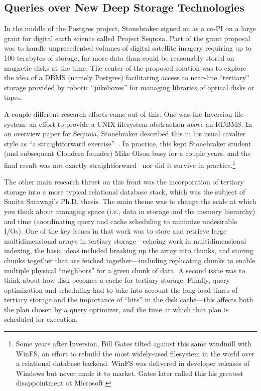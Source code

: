 \documentclass[sigconf,natbib=false]{acmart}
\begin{document}
\subsection{Queries over New Deep Storage Technologies}

In the middle of the Postgres project, Stonebraker signed on as a co-PI on a large grant for digital earth science called Project Sequoia. Part of the grant proposal was to handle unprecedented volumes of digital satellite imagery requiring up to 100 terabytes of storage, far more data than could be reasonably stored on magnetic disks at the time. The center of the proposed solution was to explore the idea of a DBMS (namely Postgres) facilitating access to near-line ``tertiary'' storage provided by robotic ``jukeboxes'' for managing libraries of optical disks or tapes. 

A couple different research efforts came out of this. One was the Inversion file system: an effort to provide a UNIX filesystem abstraction \textit{above} an RDBMS. In an overview paper for Sequoia, Stonebraker described this in his usual cavalier style as ``a straightforward exercise''~\cite{stonebraker1995overview}. In practice, this kept Stonebraker student (and subsequent Cloudera founder) Mike Olson busy for a couple years, and the final result was not exactly straightforward~\cite{inversion} nor did it survive in practice.\footnote{Some years after Inversion, Bill Gates tilted against this same windmill with WinFS, an effort to rebuild the most widely-used filesystem in the world over a relational database backend. WinFS was delivered in developer releases of Windows but never made it to market. Gates later called this his greatest disappointment at Microsoft.}

The other main research thrust on this front was the incorporation of tertiary storage into a more typical relational database stack, which was the subject of Sunita Sarawagi's Ph.D. thesis. The main theme was to change the scale at which you think about managing space (i.e., data in storage and the memory hierarchy) and time (coordinating query and cache scheduling to minimize undesirable I/Os). One of the key issues in that work was to store and retrieve large multidimensional arrays in tertiary storage---echoing work in multidimensional indexing, the basic ideas included breaking up the array into chunks, and storing chunks together that are fetched together---including replicating chunks to enable multiple physical ``neighbors'' for a given chunk of data. A second issue was to think about how disk becomes a cache for tertiary storage. Finally, query optimization and scheduling had to take into account the long load times of tertiary storage and the importance of ``hits'' in the disk cache---this affects both the plan chosen by a query optimizer, and the time at which that plan is scheduled for execution.
\end{document}

